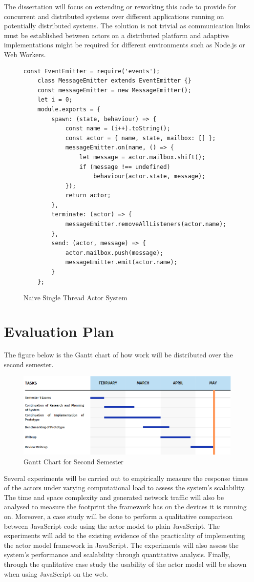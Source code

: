 \documentclass[12pt]{article}
\begin{document}
The dissertation will focus on extending or reworking this code to provide for concurrent and distributed systems over different applications running on potentially distributed systems. The solution is not trivial as communication links must be established between actors on a distributed platform and adaptive implementations might be required for different environments such as Node.js or Web Workers.
\begin{figure}[H]
  \begin{lstlisting}[gobble=2]
    const EventEmitter = require('events');
    class MessageEmitter extends EventEmitter {}
    const messageEmitter = new MessageEmitter();
    let i = 0;
    module.exports = {
        spawn: (state, behaviour) => {
            const name = (i++).toString();
            const actor = { name, state, mailbox: [] };
            messageEmitter.on(name, () => {
                let message = actor.mailbox.shift();
                if (message !== undefined)
                    behaviour(actor.state, message);
            });
            return actor;
        },
        terminate: (actor) => {
            messageEmitter.removeAllListeners(actor.name);
        },
        send: (actor, message) => {
            actor.mailbox.push(message);
            messageEmitter.emit(actor.name);
        }
    };
  \end{lstlisting}
  \caption{Naive Single Thread Actor System}
\end{figure}
\section{Evaluation Plan}
The figure below is the Gantt chart of how work will be distributed over the second semester.
\begin{figure}[H]
\includegraphics[width=\textwidth]{gantt.png}
\caption{Gantt Chart for Second Semester}
\centering
\end{figure}
Several experiments will be carried out to empirically measure the response times of the actors under varying computational load to assess the system’s scalability. The time and space complexity and generated network traffic will also be analysed to measure the footprint the framework has on the devices it is running on. Moreover, a case study will be done to perform a qualitative comparison between JavaScript code using the actor model to plain JavaScript. The experiments will add to the existing evidence of the practicality of implementing the actor model framework in JavaScript. The experiments will also assess the system's performance and scalability through quantitative analysis. Finally, through the qualitative case study the usability of the actor model will be shown when using JavaScript on the web.
\end{document}
